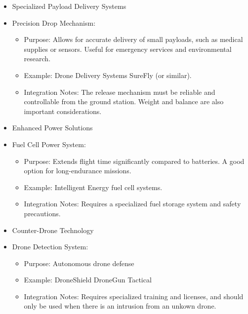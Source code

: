 \begin{itemize}
\item {Specialized Payload Delivery Systems}

\item Precision Drop Mechanism:
\begin{itemize}

\item Purpose: Allows for accurate delivery of small payloads, such as medical supplies or sensors. Useful for emergency services and environmental research.

\item Example: Drone Delivery Systems SureFly (or similar).

\item Integration Notes: The release mechanism must be reliable and controllable from the ground station. Weight and balance are also important considerations.
\end{itemize}
\end{itemize}
\begin{itemize}
\item{Enhanced Power Solutions}


\item Fuel Cell Power System:
\begin{itemize}

\item Purpose: Extends flight time significantly compared to batteries. A good option for long-endurance missions.

\item Example: Intelligent Energy fuel cell systems.

\item Integration Notes: Requires a specialized fuel storage system and safety precautions.

\end{itemize}
\end{itemize}
\begin{itemize}
\item {Counter-Drone Technology}

\item Drone Detection System:
\begin{itemize}
\item Purpose: Autonomous drone defense

\item Example: DroneShield DroneGun Tactical

\item Integration Notes: Requires specialized training and licenses, and should only be used when there is an intrusion from an unkown drone.
\end{itemize}
\end{itemize}